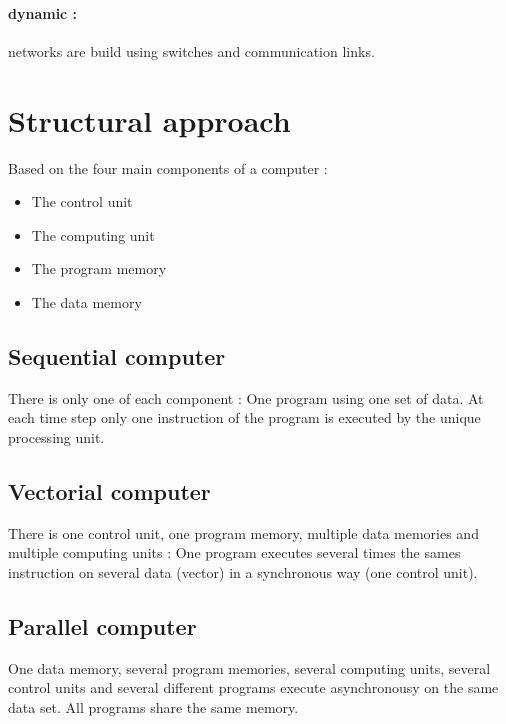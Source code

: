 \documentclass[11pt,a4paper]{report}
\begin{document}
\paragraph*{dynamic :} networks are build using switches and communication links.


\section{Structural approach} %
\label{sec:Structural approach}

Based on the four main components of a computer :
\begin{itemize}
    \item The control unit
    \item The computing unit
    \item The program memory
    \item The data memory
\end{itemize}

\subsection{Sequential computer} %
\label{sub:Sequential computer}

There is only one of each component : One program using one set of data. At each time step only one instruction of the program is executed by the unique processing unit.


\subsection{Vectorial computer} %
\label{sub:Vectorial computer}

There is one control unit, one program memory, multiple data memories and multiple computing units : One program executes several times the sames instruction on several data (vector) in a synchronous way (one control unit).


\subsection{Parallel computer} %
\label{sub:Parallel computer}

One data memory, several program memories, several computing units, several control units and several different programs execute asynchronousy on the same data set. All programs share the same memory.
\end{document}
